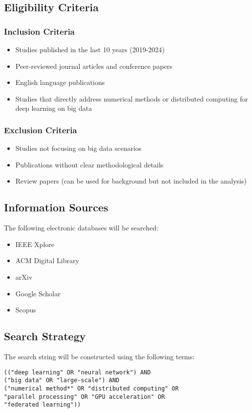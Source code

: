 \documentclass[a4paper,12pt]{article}
\begin{document}
\subsection{Eligibility Criteria}
\subsubsection{Inclusion Criteria}
\begin{itemize}
    \item Studies published in the last 10 years (2019-2024)
    \item Peer-reviewed journal articles and conference papers
    \item English language publications
    \item Studies that directly address numerical methods or distributed computing for deep learning on big data
\end{itemize}

\subsubsection{Exclusion Criteria}
\begin{itemize}
    \item Studies not focusing on big data scenarios
    \item Publications without clear methodological details
    \item Review papers (can be used for background but not included in the analysis)
\end{itemize}

\subsection{Information Sources}
The following electronic databases will be searched:
\begin{itemize}
    \item IEEE Xplore
    \item ACM Digital Library
    \item arXiv
    \item Google Scholar
    \item Scopus
\end{itemize}

\subsection{Search Strategy}
The search string will be constructed using the following terms:
\begin{verbatim}
(("deep learning" OR "neural network") AND 
("big data" OR "large-scale") AND 
("numerical method*" OR "distributed computing" OR 
"parallel processing" OR "GPU acceleration" OR 
"federated learning"))
\end{verbatim}
\end{document}
